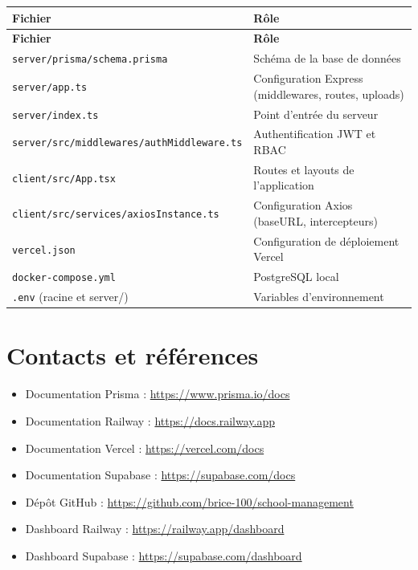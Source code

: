 \documentclass[12pt,a4paper]{report}
\begin{document}
\begin{longtable}{|p{5cm}|p{9.5cm}|}
\hline
\textbf{Fichier} & \textbf{Rôle} \\
\hline
\endfirsthead
\hline
\textbf{Fichier} & \textbf{Rôle} \\
\hline
\endhead
\texttt{server/prisma/schema.prisma} & Schéma de la base de données \\
\hline
\texttt{server/app.ts} & Configuration Express (middlewares, routes, uploads) \\
\hline
\texttt{server/index.ts} & Point d'entrée du serveur \\
\hline
\texttt{server/src/middlewares/authMiddleware.ts} & Authentification JWT et RBAC \\
\hline
\texttt{client/src/App.tsx} & Routes et layouts de l'application \\
\hline
\texttt{client/src/services/axiosInstance.ts} & Configuration Axios (baseURL, intercepteurs) \\
\hline
\texttt{vercel.json} & Configuration de déploiement Vercel \\
\hline
\texttt{docker-compose.yml} & PostgreSQL local \\
\hline
\texttt{.env} (racine et server/) & Variables d'environnement \\
\hline
\end{longtable}

\section{Contacts et références}

\begin{itemize}
    \item Documentation Prisma : \url{https://www.prisma.io/docs}
    \item Documentation Railway : \url{https://docs.railway.app}
    \item Documentation Vercel : \url{https://vercel.com/docs}
    \item Documentation Supabase : \url{https://supabase.com/docs}
    \item Dépôt GitHub : \url{https://github.com/brice-100/school-management}
    \item Dashboard Railway : \url{https://railway.app/dashboard}
    \item Dashboard Supabase : \url{https://supabase.com/dashboard}
\end{itemize}
\end{document}
